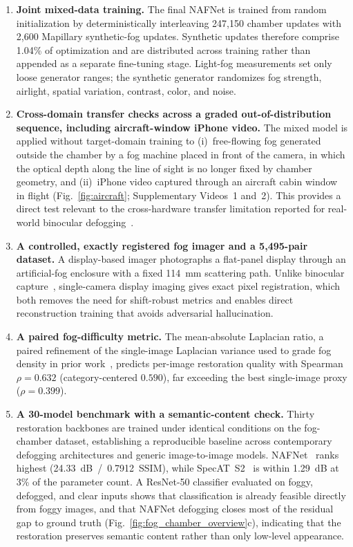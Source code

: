 \documentclass{optica-article}
\begin{document}
\begin{enumerate}

\item \textbf{Joint mixed-data training.} The final NAFNet is trained
from random initialization by deterministically interleaving
247{,}150 chamber updates with 2{,}600 Mapillary synthetic-fog
updates. Synthetic updates therefore comprise 1.04\% of optimization
and are distributed across training rather than appended as a
separate fine-tuning stage. Light-fog measurements set only loose
generator ranges; the synthetic generator randomizes fog strength,
airlight, spatial variation, contrast, color, and noise.

\item \textbf{Cross-domain transfer checks across a graded
out-of-distribution sequence, including aircraft-window iPhone
video.} The mixed model is applied without target-domain training to
(i)~free-flowing fog generated outside the chamber by a fog machine placed
in front of the camera, in which the optical depth along the line of
sight is no longer fixed by chamber geometry, and (ii)~iPhone video captured
through an aircraft cabin window in flight
(Fig.~\ref{fig:aircraft}; Supplementary Videos~1 and~2). This
provides a direct test relevant to the cross-hardware transfer
limitation reported for real-world binocular
defogging~\cite{pollak2024stereofog}.

\item \textbf{A controlled, exactly registered fog imager and a
5{,}495-pair dataset.} A display-based imager photographs a flat-panel display through an artificial-fog enclosure
with a fixed 114~mm scattering path. Unlike binocular
capture~\cite{pollak2024stereofog}, single-camera display imaging
gives exact pixel registration, which both removes the need for
shift-robust metrics and enables direct reconstruction training
that avoids adversarial hallucination.

\item \textbf{A paired fog-difficulty metric.} The mean-absolute
Laplacian ratio, a paired refinement of the single-image Laplacian
variance used to grade fog density in prior
work~\cite{pollak2024stereofog}, predicts per-image restoration
quality with Spearman $\rho = 0.632$ (category-centered $0.590$),
far exceeding the best single-image proxy ($\rho = 0.399$).

\item \textbf{A 30-model benchmark with a semantic-content check.}
Thirty restoration backbones are trained under identical conditions
on the fog-chamber dataset, establishing a reproducible baseline
across contemporary defogging architectures and generic
image-to-image models. NAFNet~\cite{chen2022simple} ranks highest
(24.33~dB~/~0.7912~SSIM), while SpecAT~S2~\cite{yao2024specat} is
within 1.29~dB at 3\% of the parameter count. A ResNet-50
classifier evaluated on foggy, defogged, and clear inputs shows
that classification is already feasible directly from foggy
images, and that NAFNet defogging closes most of the residual gap
to ground truth (Fig.~\ref{fig:fog_chamber_overview}c), indicating
that the restoration preserves semantic content rather than only
low-level appearance.

\end{enumerate}
\end{document}
